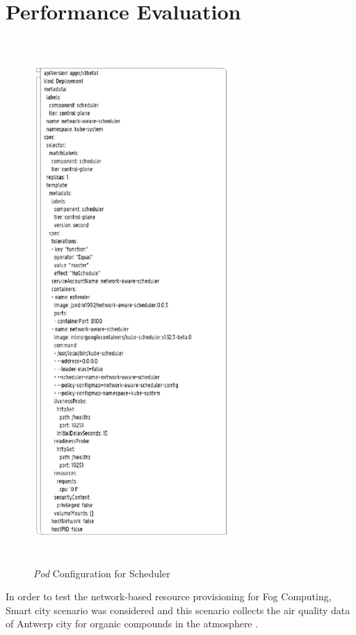 \section{Performance Evaluation}
\label{sec:Performance_eval}
\begin{figure}
  \centering
  \includegraphics[width=75mm, height=20cm]{figures/mlcn-k8s-pod-config.pdf}
  \caption{\emph{Pod} Configuration for Scheduler\cite{Santos2019}}
  \label{fig:k8s-pod-config}
\end{figure}
In order to test the network-based resource provisioning for Fog Computing, Smart city scenario was considered and this scenario collects the air quality data of Antwerp city for organic compounds in the atmosphere \cite{Santos2019}.
